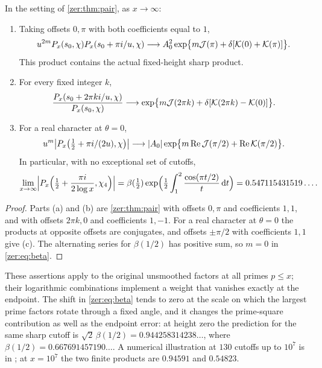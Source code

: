 \begin{corollary}[\stG]\label{zer:cor:pairs}
In the setting of \cref{zer:thm:pair}, as $x\to\infty$:
\begin{enumerate}[label=\textup{(\alph*)}]
\item Taking offsets $0,\pi$ with both coefficients equal to $1$,
\[
 u^{2m}P_x(s_0,\chi)P_x(s_0+\pi i/u,\chi)\longrightarrow
 A_0^2\exp\bigl\{m\zerJ(\pi)+\delta[\zerK(0)+\zerK(\pi)]\bigr\}.
\]
This product contains the actual fixed-height sharp product.
\item For every fixed integer $k$,
\[
 \frac{P_x(s_0+2\pi ki/u,\chi)}{P_x(s_0,\chi)}\longrightarrow
 \exp\bigl\{m\zerJ(2\pi k)+\delta[\zerK(2\pi k)-\zerK(0)]\bigr\}.
\]
\item For a real character at $\theta=0$,
\[
 u^m\abs[\big]{P_x\bigl(\tfrac12+\pi i/(2u),\chi\bigr)}\longrightarrow
 \abs{A_0}\exp\bigl\{m\Re\zerJ(\pi/2)+\Re\zerK(\pi/2)\bigr\}.
\]
In particular, with no exceptional set of cutoffs,
\begin{equation}\label{zer:eq:beta}
 \lim_{x\to\infty}\abs[\Big]{P_x\Bigl(\tfrac12+\frac{\pi i}{2\log x},\chi_4\Bigr)}
 =\beta(\tfrac12)\exp\Bigl(\tfrac12\int_1^2\frac{\cos(\pi t/2)}t\,\dd t\Bigr)
 =0.547115431519\ldots .
\end{equation}
\end{enumerate}
\end{corollary}
\begin{proof}
Parts (a) and (b) are \cref{zer:thm:pair} with offsets $0,\pi$ and coefficients $1,1$, and
with offsets $2\pi k,0$ and coefficients $1,-1$. For a real character at $\theta=0$ the
products at opposite offsets are conjugates, and offsets $\pm\pi/2$ with coefficients $1,1$
give (c). The alternating series for $\beta(1/2)$ has positive sum, so $m=0$ in
\eqref{zer:eq:beta}.
\end{proof}

These assertions apply to the original unsmoothed factors at all primes $p\le x$; their
logarithmic combinations implement a weight that vanishes exactly at the endpoint. The shift
in \eqref{zer:eq:beta} tends to zero at the scale on which the largest prime factors rotate
through a fixed angle, and it changes the prime-square contribution as well as the endpoint
error: at height zero the prediction for the same sharp cutoff is
$\sqrt2\,\beta(1/2)=0.944258314238\ldots$, where $\beta(1/2)=0.667691457190\ldots$. A
numerical illustration at $130$ cutoffs up to $10^7$ is in
; at $x=10^7$ the two finite
products are $0.94591$ and $0.54823$.

